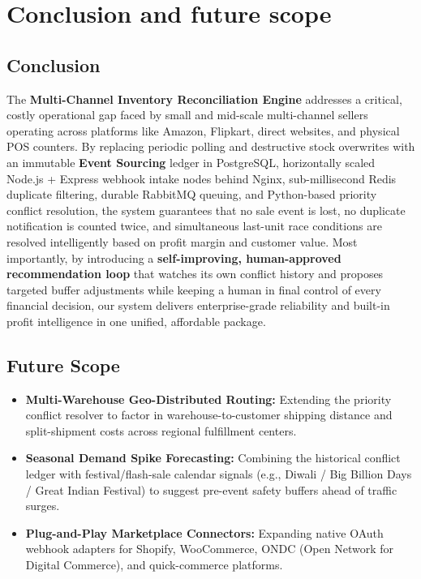 \documentclass[oneside,a4paper,12pt]{report}
\begin{document}
\chapter{Conclusion and future scope}

\section*{Conclusion}
The \textbf{Multi-Channel Inventory Reconciliation Engine} addresses a critical, costly operational gap faced by small and mid-scale multi-channel sellers operating across platforms like Amazon, Flipkart, direct websites, and physical POS counters. By replacing periodic polling and destructive stock overwrites with an immutable \textbf{Event Sourcing} ledger in PostgreSQL, horizontally scaled Node.js + Express webhook intake nodes behind Nginx, sub-millisecond Redis duplicate filtering, durable RabbitMQ queuing, and Python-based priority conflict resolution, the system guarantees that no sale event is lost, no duplicate notification is counted twice, and simultaneous last-unit race conditions are resolved intelligently based on profit margin and customer value. Most importantly, by introducing a \textbf{self-improving, human-approved recommendation loop} that watches its own conflict history and proposes targeted buffer adjustments while keeping a human in final control of every financial decision, our system delivers enterprise-grade reliability and built-in profit intelligence in one unified, affordable package.

\section*{Future Scope}
\begin{itemize}
  \item \textbf{Multi-Warehouse Geo-Distributed Routing:} Extending the priority conflict resolver to factor in warehouse-to-customer shipping distance and split-shipment costs across regional fulfillment centers.
  \item \textbf{Seasonal Demand Spike Forecasting:} Combining the historical conflict ledger with festival/flash-sale calendar signals (e.g., Diwali / Big Billion Days / Great Indian Festival) to suggest pre-event safety buffers ahead of traffic surges.
  \item \textbf{Plug-and-Play Marketplace Connectors:} Expanding native OAuth webhook adapters for Shopify, WooCommerce, ONDC (Open Network for Digital Commerce), and quick-commerce platforms.
\end{itemize}
\end{document}
